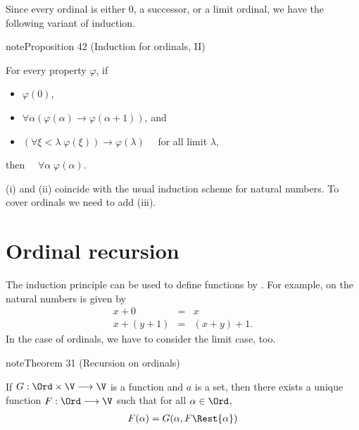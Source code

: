 \documentclass[letterpaper,10pt,english]{jupyterBook}
\begin{document}
\sphinxAtStartPar
Since every ordinal is either \(0\), a successor, or a limit ordinal, we have the following variant of induction.
\label{recursion:prop-induction-ord-ii}
\begin{sphinxadmonition}{note}{Proposition 42 (Induction for ordinals, II)}



\sphinxAtStartPar
For every property \(\varphi\), if
\begin{itemize}
\item {} 
\sphinxAtStartPar
{} \(\varphi(0)\),

\item {} 
\sphinxAtStartPar
{} \(\forall \alpha (\varphi(\alpha) \to \varphi(\alpha+1))\), and

\item {} 
\sphinxAtStartPar
{} \((\forall \xi < \lambda \; \varphi(\xi)) \to \varphi(\lambda)\quad \) for all limit \(\lambda\),

\end{itemize}

\sphinxAtStartPar
then \(\quad \forall \alpha \;  \varphi(\alpha)\).
\end{sphinxadmonition}

\sphinxAtStartPar
(i) and (ii) coincide with the usual induction scheme for natural numbers. To cover  ordinals we need to add (iii).


\section{Ordinal recursion}
\label{\detokenize{recursion:ordinal-recursion}}
\sphinxAtStartPar
The induction principle can be used to define functions by . For example,  on the natural numbers is given by
\begin{eqnarray*}
    x+0 \quad & = & x\\
    x+ (y+1) & = & (x + y)+1. 
\end{eqnarray*}
\sphinxAtStartPar
In the case of ordinals, we have to consider the limit case, too.
\label{recursion:thm-ordinal-recursion}
\begin{sphinxadmonition}{note}{Theorem 31 (Recursion on ordinals)}



\sphinxAtStartPar
If \(G :\Ord \times \V \longrightarrow  \V\) is a function and \(a\) is a set, then there exists a unique function \(F: \Ord \longrightarrow \V\)  such that for all \(\alpha \in \Ord\),
\begin{equation*}
\begin{split}
F(\alpha) = G(\alpha, F\Rest{\alpha})
\end{split}
\end{equation*}\end{sphinxadmonition}
\end{document}
